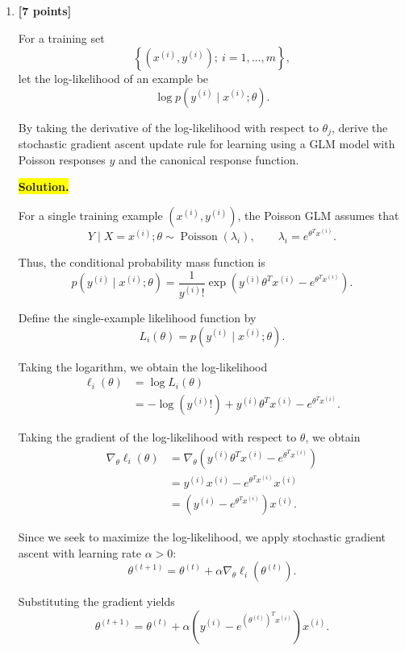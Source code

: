\documentclass[10pt]{article}
\begin{document}
\begin{enumerate}
\begin{enumerate}[label=(\alph*)]
\item \textbf{[7 points]}

For a training set
\[
\left\{
(x^{(i)},y^{(i)});
\ i=1,\ldots,m
\right\},
\]
let the log-likelihood of an example be
\[
\log p(y^{(i)}\mid x^{(i)};\theta).
\]

By taking the derivative of the log-likelihood with respect to
$\theta_j$, derive the stochastic gradient ascent update rule for
learning using a GLM model with Poisson responses $y$ and the canonical
response function.


\medskip
\noindent\colorbox{yellow}{\textbf{Solution.}}
\vspace{3mm}

For a single training example $(x^{(i)},y^{(i)})$, the Poisson GLM
assumes that
\[
Y\mid X=x^{(i)};\theta
\sim \operatorname{Poisson}(\lambda_i),
\qquad
\lambda_i=e^{\theta^Tx^{(i)}}.
\]

Thus, the conditional probability mass function is
\[
p(y^{(i)}\mid x^{(i)};\theta)
=
\frac{1}{y^{(i)}!}
\exp\left(
y^{(i)}\theta^Tx^{(i)}
-
e^{\theta^Tx^{(i)}}
\right).
\]

Define the single-example likelihood function by
\[
L_i(\theta)
=
p(y^{(i)}\mid x^{(i)};\theta).
\]

Taking the logarithm, we obtain the log-likelihood
\[
\begin{aligned}
\ell_i(\theta)
&=\log L_i(\theta)\\
&=
-\log(y^{(i)}!)
+
y^{(i)}\theta^Tx^{(i)}
-
e^{\theta^Tx^{(i)}}.
\end{aligned}
\]

Taking the gradient of the log-likelihood with respect to
$\theta$, we obtain
\[
\begin{aligned}
\nabla_\theta \ell_i(\theta)
&=
\nabla_\theta
\left(
y^{(i)}\theta^Tx^{(i)}
-
e^{\theta^Tx^{(i)}}
\right)\\
&=
y^{(i)}x^{(i)}
-
e^{\theta^Tx^{(i)}}x^{(i)}\\
&=
\boxed{
\left(
y^{(i)}-e^{\theta^Tx^{(i)}}
\right)x^{(i)}
}.
\end{aligned}
\]


Since we seek to maximize the log-likelihood, we apply
stochastic gradient ascent with learning rate $\alpha>0$:
\[
\theta^{(t+1)}
=
\theta^{(t)}
+
\alpha\nabla_\theta\ell_i(\theta^{(t)}).
\]

Substituting the gradient yields
\[
\boxed{
\theta^{(t+1)}
=
\theta^{(t)}
+
\alpha
\left(
y^{(i)}
-
e^{(\theta^{(t)})^Tx^{(i)}}
\right)x^{(i)}.
}
\]


\end{enumerate}
\end{enumerate}
\end{document}
